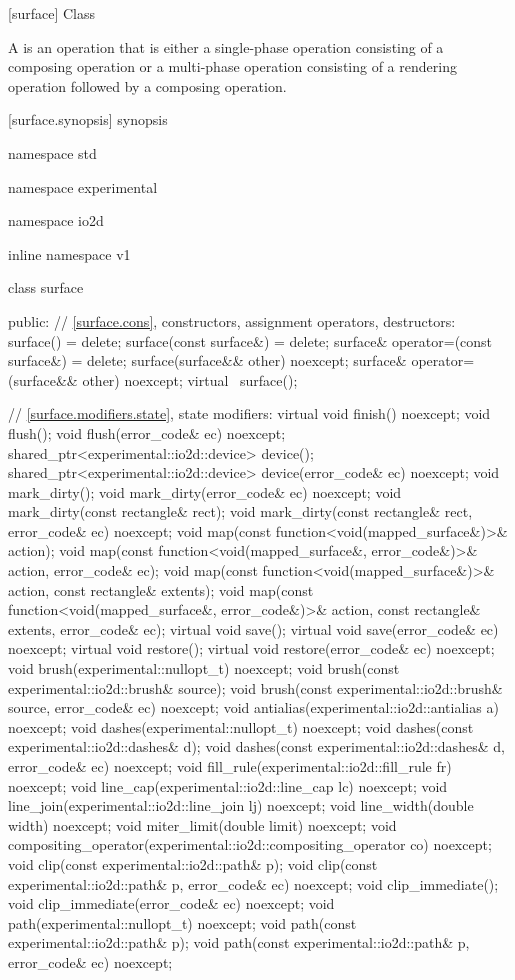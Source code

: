  [surface] {Class }

\pnum
A  is an operation that is either a single-phase operation consisting of a composing operation or a multi-phase operation consisting of a rendering operation followed by a composing operation.

 [surface.synopsis] { synopsis}

\begin{codeblock}
namespace std { namespace experimental { namespace io2d { inline namespace v1 {
  class surface {
  public:
    // \ref{surface.cons}, constructors, assignment operators, destructors:
    surface() = delete;
    surface(const surface&) = delete;
    surface& operator=(const surface&) = delete;
    surface(surface&& other) noexcept;
    surface& operator=(surface&& other) noexcept;
    virtual ~surface();

    // \ref{surface.modifiers.state}, state modifiers:
    virtual void finish() noexcept;
    void flush();
    void flush(error_code& ec) noexcept;
    shared_ptr<experimental::io2d::device> device();
    shared_ptr<experimental::io2d::device> device(error_code& ec) noexcept;
    void mark_dirty();
    void mark_dirty(error_code& ec) noexcept;
    void mark_dirty(const rectangle& rect);
    void mark_dirty(const rectangle& rect, error_code& ec) noexcept;
    void map(const function<void(mapped_surface&)>& action);
    void map(const function<void(mapped_surface&, error_code&)>& action,
      error_code& ec);
    void map(const function<void(mapped_surface&)>& action,
      const rectangle& extents);
    void map(const function<void(mapped_surface&, error_code&)>& action,
      const rectangle& extents, error_code& ec);
    virtual void save();
    virtual void save(error_code& ec) noexcept;
    virtual void restore();
    virtual void restore(error_code& ec) noexcept;
    void brush(experimental::nullopt_t) noexcept;
    void brush(const experimental::io2d::brush& source);
    void brush(const experimental::io2d::brush& source, error_code& ec)
      noexcept;
    void antialias(experimental::io2d::antialias a) noexcept;
    void dashes(experimental::nullopt_t) noexcept;
    void dashes(const experimental::io2d::dashes& d);
    void dashes(const experimental::io2d::dashes& d, error_code& ec) noexcept;
    void fill_rule(experimental::io2d::fill_rule fr) noexcept;
    void line_cap(experimental::io2d::line_cap lc) noexcept;
    void line_join(experimental::io2d::line_join lj) noexcept;
    void line_width(double width) noexcept;
    void miter_limit(double limit) noexcept;
    void compositing_operator(experimental::io2d::compositing_operator co)
      noexcept;
    void clip(const experimental::io2d::path& p);
    void clip(const experimental::io2d::path& p, error_code& ec) noexcept;
    void clip_immediate();
    void clip_immediate(error_code& ec) noexcept;
    void path(experimental::nullopt_t) noexcept;
    void path(const experimental::io2d::path& p);
    void path(const experimental::io2d::path& p, error_code& ec) noexcept;

}}}}}
\end{codeblock}
